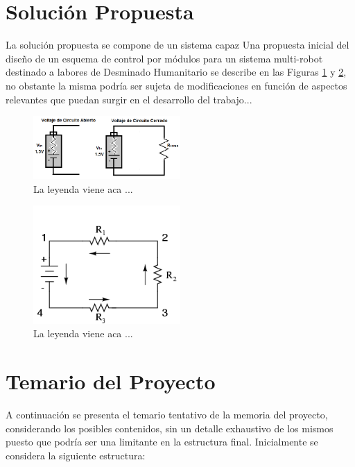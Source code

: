 \documentclass[12pt,letterpaper]{article}
\begin{document}
\section{Solución Propuesta}

La solución propuesta se compone de un sistema capaz 
Una propuesta inicial del diseño de un esquema de control por módulos para un sistema multi-robot destinado 
a labores de Desminado Humanitario se describe en las Figuras \ref{fig:esquema1} y \ref{fig:esquema2}, no obstante 
la misma podría ser sujeta de modificaciones en función de aspectos relevantes que puedan surgir 
en el desarrollo del trabajo...

\begin{figure}[h!] 
\centering
\includegraphics[width=0.5\textwidth]{esquema1}
\caption{La leyenda viene aca ...}
\label{fig:esquema1}
\end{figure}


\begin{figure}[h!] 
\centering
\includegraphics[width=0.5\textwidth]{esquema2}
\caption{La leyenda viene aca ...}
\label{fig:esquema2}
\end{figure}







 
 





\section{Temario del Proyecto}
A continuación se presenta el temario tentativo de la memoria del proyecto, considerando los posibles contenidos, sin un detalle exhaustivo de los mismos puesto que podría ser una limitante en la estructura final. Inicialmente se considera la siguiente estructura:\\
\end{document}
